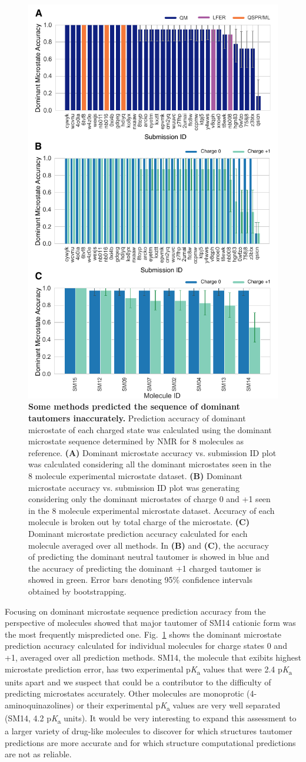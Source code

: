 \documentclass[9pt,lineno,final]{elife}
\newcommand{\pKa}{p\textit{K}\textsubscript{a}}
\begin{document}
\begin{figure}[h!]
\centering
\includegraphics[width=0.5\linewidth]{figures/typeI_dominant_microstate_accuracy.pdf}
\caption{{\bf Some methods predicted the sequence of dominant tautomers inaccurately.} Prediction accuracy of dominant microstate of each charged state was calculated using the dominant microstate sequence determined by NMR for 8 molecules as reference. 
{\bf(A)} Dominant microstate accuracy vs. submission ID plot was calculated considering all the dominant microstates seen in the 8 molecule experimental microstate dataset. {\bf(B)} Dominant microstate accuracy vs. submission ID plot was generating considering only the dominant microstates of charge 0 and +1 seen in the 8 molecule experimental microstate dataset. Accuracy of each molecule is broken out by total charge of the microstate. {\bf(C)} Dominant microstate prediction accuracy calculated for each molecule averaged over all methods. In {\bf(B)} and {\bf(C)}, the accuracy of predicting the dominant neutral tautomer is showed in blue and the accuracy of predicting the dominant +1 charged tautomer is showed in green. Error bars denoting 95\% confidence intervals obtained by bootstrapping.
}
\label{fig:typeI_dominant_microstate_accuracy}
\end{figure}

Focusing on dominant microstate sequence prediction accuracy from the perspective of molecules showed that major tautomer of SM14 cationic form was the most frequently mispredicted one. 
Fig.~\ref{fig:typeI_dominant_microstate_accuracy} shows the dominant microstate prediction accuracy calculated for individual molecules for charge states 0 and +1, averaged over all prediction methods. 
SM14, the molecule that exibits highest microstate prediction error, has two experimental \pKa{} values that were 2.4 \pKa{} units apart and we suspect that could be a contributor to the difficulty of predicting microstates accurately. 
Other molecules are monoprotic (4-aminoquinazolines) or their experimental \pKa{} values are very well separated (SM14, 4.2 \pKa{} units). 
It would be very interesting to expand this assessment to a larger variety of drug-like molecules to discover for which structures tautomer predictions are more accurate and for which structure computational predictions are not as reliable.
\end{document}
